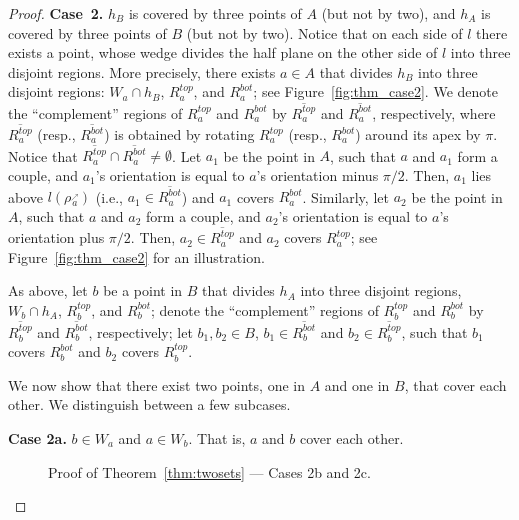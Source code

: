 \documentclass[11pt,letter]{article}
\def\wedge#1{{W_{{#1}}}}
\def\halfplane#1{{h_{{#1}}}}
\def\rightray#1{{\rho{\stackrel{_\nearrow}{_{#1}}}}}
\def\rightline#1{{l(\rightray{#1})}}
\def\topregion#1{{{R}^{top}_{{#1}}}}
\def\bottomregion#1{{{R}^{bot}_{{#1}}}}
\begin{document}
\begin{proof}
{\bf Case~2.}
$\halfplane{B}$ is covered by three points of $A$ (but not by two), and $\halfplane{A}$ is covered by three points of $B$ (but not by two).
Notice that on each side of $l$ there exists a point, whose wedge
divides the half plane on the other side of $l$ into three disjoint regions.
More precisely, there exists $a \in A$ that divides $\halfplane{B}$
into three disjoint regions:
$\wedge{a} \cap \halfplane{B}$, $\topregion{a}$, and $\bottomregion{a}$; see Figure~\ref{fig:thm_case2}.
We denote the ``complement'' regions of $\topregion{a}$ and $\bottomregion{a}$ by $\overline{\topregion{a}}$ and $\overline{\bottomregion{a}}$, respectively, where $\overline{\topregion{a}}$ (resp., $\overline{\bottomregion{a}}$) is obtained by rotating $\topregion{a}$ (resp., $\bottomregion{a}$) around its apex by $\pi$.
Notice that $\overline{\topregion{a}} \cap \overline{\bottomregion{a}} \neq \emptyset$.
Let $a_1$ be the point in $A$, such that $a$ and $a_1$ form a couple, and $a_1$'s orientation is equal to $a$'s orientation minus $\pi/2$.
Then, $a_1$ lies above $\rightline{a}$ (i.e., $a_1 \in \overline{\bottomregion{a}}$) and $a_1$ covers $\bottomregion{a}$.
Similarly, let $a_2$ be the point in $A$, such that $a$ and $a_2$ form a couple, and $a_2$'s orientation is equal to $a$'s orientation plus $\pi/2$. Then, $a_2 \in \overline{\topregion{a}}$ and $a_2$ covers $\topregion{a}$; see Figure~\ref{fig:thm_case2} for an illustration.

As above, let $b$ be a point in $B$ that divides $\halfplane{A}$ into three disjoint regions,
$\wedge{b} \cap \halfplane{A}$, $\topregion{b}$, and $\bottomregion{b}$; denote the
``complement'' regions of $\topregion{b}$ and $\bottomregion{b}$ by $\overline{\topregion{b}}$ and $\overline{\bottomregion{b}}$, respectively;
let $b_1, b_2 \in B$,
$b_1 \in \overline{\bottomregion{b}}$ and
$b_2 \in \overline{\topregion{b}}$, such that
$b_1$ covers $\bottomregion{b}$ and $b_2$ covers $\topregion{b}$.

We now show that there exist two points, one in $A$ and one in $B$, that cover each other.
We distinguish between a few subcases.



\noindent
{\bf Case 2a.} $b \in \wedge{a}$ and $a \in \wedge{b}$. That is, $a$ and $b$ cover each other.


\begin{figure}[htb]
 \centering
 \hspace{0.5cm}
\caption{Proof of Theorem~\ref{thm:twosets} --- Cases 2b and 2c.}
\end{figure}




\end{proof}
\end{document}
